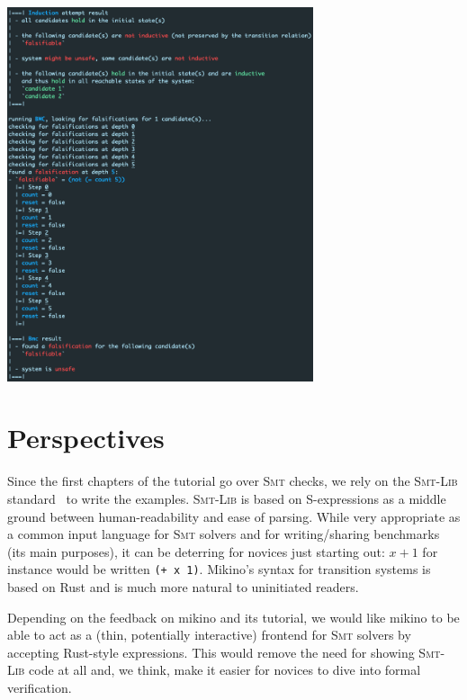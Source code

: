 \documentclass{easychair}
\newcommand{\Mkn}{Mikino}
\newcommand{\mkn}{mikino}
\newcommand{\smt}{\textsc{Smt}}
\newcommand{\smtlib}{\smt{}-\textsc{Lib}}
\newcommand{\code}[1]{\textcolor{orange!75!black}{\texttt{#1}}}
\newcommand{\picwidth}{9cm}
\begin{document}
\begin{center}
    \includegraphics[width=\picwidth]{../rsc/stopwatch_run_3.png}
\end{center}


\section{Perspectives}%
\label{app:perspectives}

Since the first chapters of the tutorial go over \smt{} checks, we rely on the \smtlib{}
standard~\cite{smtlib} to write the examples. \smtlib{} is based on S-expressions as a middle
ground between human-readability and ease of parsing. While very appropriate as a common input
language for \smt{} solvers and for writing/sharing benchmarks (its main purposes), it can be
deterring for novices just starting out: \(x + 1\) for instance would be written \code{(+ x 1)}.
\Mkn{}'s syntax for transition systems is based on Rust and is much more natural to uninitiated
readers.

Depending on the feedback on \mkn{} and its tutorial, we would like \mkn{} to be able to act as a
(thin, potentially interactive) frontend for \smt{} solvers by accepting Rust-style expressions.
This would remove the need for showing \smtlib{} code at all and, we think, make it easier for
novices to dive into formal verification.
\end{document}
